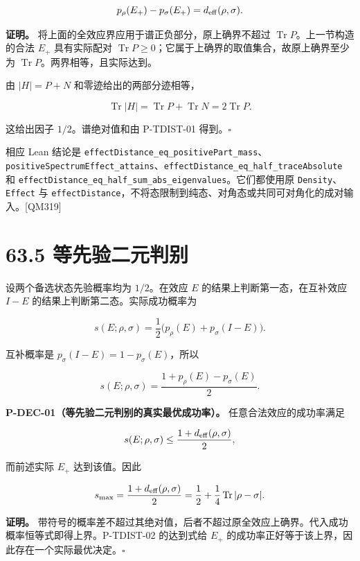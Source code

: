 \documentclass[
  11pt,
  oneside]{book}
\begin{document}
\[
p_\rho(E_+)-p_\sigma(E_+)
=d_{\rm eff}(\rho,\sigma).
\]

\textbf{证明。} 将上面的全效应界应用于谱正负部分，原上确界不超过
\(\operatorname{Tr}P\)。上一节构造的合法 \(E_+\) 具有实际配对
\(\operatorname{Tr}P\ge0\)；它属于上确界的取值集合，故原上确界至少为
\(\operatorname{Tr}P\)。两界相等，且实际达到。

由 \(|H|=P+N\) 和零迹给出的两部分迹相等，

\[
\operatorname{Tr}|H|
=\operatorname{Tr}P+\operatorname{Tr}N
=2\operatorname{Tr}P.
\]

这给出因子 \(1/2\)。谱绝对值和由 P-TDIST-01 得到。\(\square\)

相应 Lean 结论是
\texttt{effect\allowbreak Distance\_\allowbreak eq\_\allowbreak positive\allowbreak Part\_\allowbreak mass}、\allowbreak \texttt{positive\allowbreak Spectrum\allowbreak Effect\_\allowbreak attains}、\allowbreak \texttt{effect\allowbreak Distance\_\allowbreak eq\_\allowbreak half\_\allowbreak trace\allowbreak Absolute}
和
\texttt{effect\allowbreak Distance\_\allowbreak eq\_\allowbreak half\_\allowbreak sum\_\allowbreak abs\_\allowbreak eigenvalues}。它们都使用原
\texttt{Density}、\allowbreak \texttt{Effect} 与
\texttt{effect\allowbreak Distance}，不将态限制到纯态、对角态或共同可对角化的成对输入。{[}QM319{]}

\section{63.5 等先验二元判别}

设两个备选状态先验概率均为 \(1/2\)。在效应 \(E\)
的结果上判断第一态，在互补效应 \(I-E\)
的结果上判断第二态。实际成功概率为

\[
s(E;\rho,\sigma)
=\frac12\bigl(p_\rho(E)+p_\sigma(I-E)\bigr).
\]

互补概率是 \(p_\sigma(I-E)=1-p_\sigma(E)\)，所以

\[
s(E;\rho,\sigma)
=\frac{1+p_\rho(E)-p_\sigma(E)}2.
\]

\protect\hypertarget{p-dec-01}{}{}

\textbf{P-DEC-01（等先验二元判别的真实最优成功率）。}
任意合法效应的成功率满足

\[
s(E;\rho,\sigma)\le\frac{1+d_{\rm eff}(\rho,\sigma)}2,
\]

而前述实际 \(E_+\) 达到该值。因此

\[
s_{\max}
=\frac{1+d_{\rm eff}(\rho,\sigma)}2
=\frac12+\frac14\operatorname{Tr}|\rho-\sigma|.
\]

\textbf{证明。}
带符号的概率差不超过其绝对值，后者不超过原全效应上确界。代入成功概率恒等式即得上界。P-TDIST-02
的达到式给 \(E_+\)
的成功率正好等于该上界，因此存在一个实际最优决定。\(\square\)
\end{document}
